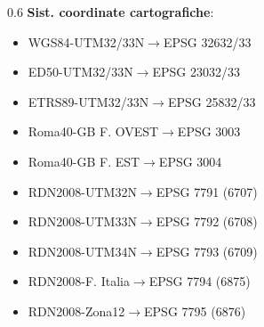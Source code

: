 \documentclass{beamer}
\begin{document}
{\begin{frame}
\begin{columns}
\begin{column} {0.6\textwidth}
    \textbf{Sist. coordinate cartografiche}:
    \footnotesize{		
    \begin{itemize}
		\item WGS84-UTM32/33N$\rightarrow$EPSG 32632/33
		\item ED50-UTM32/33N$\rightarrow$EPSG 23032/33
		\item ETRS89-UTM32/33N$\rightarrow$EPSG 25832/33
		\item Roma40-GB F. OVEST$ \rightarrow $EPSG 3003
		\item Roma40-GB F. EST$ \rightarrow $EPSG 3004
		\item RDN2008-UTM32N$\rightarrow$EPSG 7791 (6707)
		\item RDN2008-UTM33N$\rightarrow$EPSG 7792 (6708)
		\item RDN2008-UTM34N$\rightarrow$EPSG 7793 (6709)
		\item RDN2008-F. Italia$\rightarrow$EPSG 7794 (6875)
		\item RDN2008-Zona12$\rightarrow$EPSG 7795 (6876)
					
  	\end{itemize}
	}
  	\end{column}
  	\end{columns}

\end{frame}

}
\end{document}
